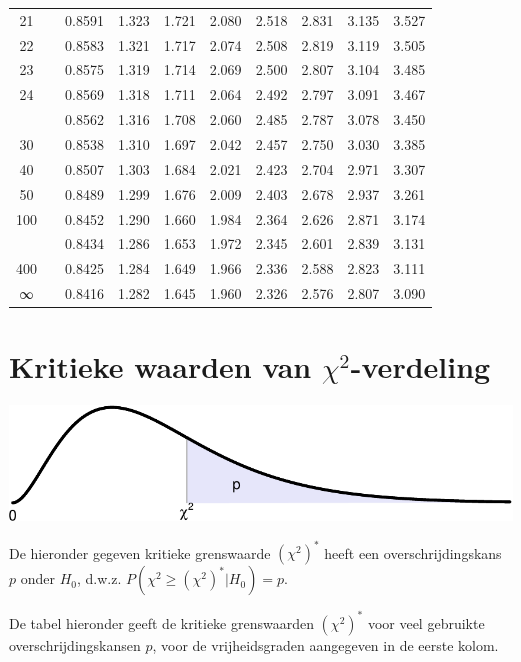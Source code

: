 \documentclass[
]{book}
\begin{document}
\begin{tabular}{cccccccccc}
21 &  & 0.8591 & 1.323 & 1.721 & 2.080 & 2.518 & 2.831 & 3.135 & 3.527\\
22 &  & 0.8583 & 1.321 & 1.717 & 2.074 & 2.508 & 2.819 & 3.119 & 3.505\\
23 &  & 0.8575 & 1.319 & 1.714 & 2.069 & 2.500 & 2.807 & 3.104 & 3.485\\
24 &  & 0.8569 & 1.318 & 1.711 & 2.064 & 2.492 & 2.797 & 3.091 & 3.467\\
\addlinespace
25 &  & 0.8562 & 1.316 & 1.708 & 2.060 & 2.485 & 2.787 & 3.078 & 3.450\\
30 &  & 0.8538 & 1.310 & 1.697 & 2.042 & 2.457 & 2.750 & 3.030 & 3.385\\
40 &  & 0.8507 & 1.303 & 1.684 & 2.021 & 2.423 & 2.704 & 2.971 & 3.307\\
50 &  & 0.8489 & 1.299 & 1.676 & 2.009 & 2.403 & 2.678 & 2.937 & 3.261\\
100 &  & 0.8452 & 1.290 & 1.660 & 1.984 & 2.364 & 2.626 & 2.871 & 3.174\\
\addlinespace
200 &  & 0.8434 & 1.286 & 1.653 & 1.972 & 2.345 & 2.601 & 2.839 & 3.131\\
400 &  & 0.8425 & 1.284 & 1.649 & 1.966 & 2.336 & 2.588 & 2.823 & 3.111\\
∞ &  & 0.8416 & 1.282 & 1.645 & 1.960 & 2.326 & 2.576 & 2.807 & 3.090\\
\bottomrule
\end{tabular}

\hypertarget{app:kritiekechi2waarden}{%
\chapter{\texorpdfstring{Kritieke waarden van \(\chi^2\)-verdeling}{Kritieke waarden van \textbackslash chi\^{}2-verdeling}}\label{app:kritiekechi2waarden}}

\includegraphics{KMS-NL_files/figure-latex/kritiekechi2waarden-hulpfiguur-1.pdf}

De hieronder gegeven kritieke grenswaarde \((\chi^2)^*\) heeft een overschrijdingskans \(p\)
onder \(H_0\), d.w.z. \(P(\chi^2 \geq (\chi^2)^*|H_0)=p\).

De tabel hieronder geeft de kritieke grenswaarden \((\chi^2)^*\) voor veel gebruikte overschrijdingskansen \(p\), voor de vrijheidsgraden aangegeven in de eerste kolom.
\end{document}

